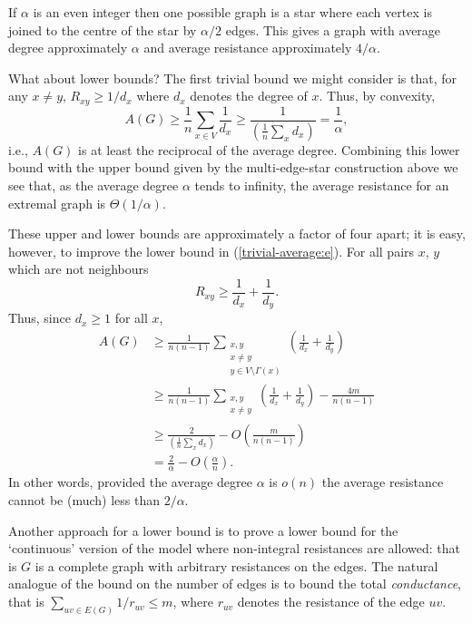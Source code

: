 \documentclass[11pt]{article}
\theoremstyle{remark}
\begin{document}
If $\alpha$ is an even integer then one possible graph is a star where
each vertex is joined to the centre of the star by $\alpha/2$ edges.
This gives a graph with average degree approximately $\alpha$ and
average resistance approximately $4/\alpha$.

What about lower bounds?  The first trivial bound we might consider is
that, for any $x\not=y$, $R_{xy}\ge 1/d_x$ where $d_x$ denotes the
degree of $x$. Thus, by convexity,
\begin{equation}\label{trivial-average:e}
A(G)\ge \frac1{n}\sum_{x\in V} \frac{1}{d_x}\ge \frac{1}{(\frac 1n\sum_xd_x)}=\frac{1}{\alpha},
\end{equation}
i.e., $A(G)$ is at least the reciprocal of the average
degree. Combining this lower bound with the upper bound given by the
multi-edge-star construction above we see that, as the average degree $\alpha$ tends to
infinity, the average resistance for an extremal graph is $\Theta(1/\alpha)$.

These upper and lower bounds are approximately a factor of four apart;
it is easy, however, to improve the lower bound in
(\ref{trivial-average:e}). For all pairs $x$, $y$ which are not
neighbours
\[R_{xy}\ge \frac{1}{d_x}+\frac{1}{d_y}.
\]
Thus, since $d_x\ge 1$ for all $x$,
\begin{align*}
A(G)&\ge \frac1{n(n-1)}\sum_{\substack{x,y\\x\not=y\\y \in V\setminus \Gamma(x)}} \left(\frac{1}{d_x}+\frac{1}{d_y}\right)\\
&\ge \frac1{n(n-1)}\sum_{\substack{x,y\\x\not=y}}\left( \frac{1}{d_x}+\frac{1}{d_y}\right) -\frac{4m}{n(n-1)}\\
&\ge \frac{2}{(\frac 1n\sum_xd_x)}-O\left(\frac{m}{n(n-1)}\right)\\
&= \frac{2}{\alpha}-O\left(\frac{\alpha}{n}\right).
\end{align*}
In other words, provided the average degree $\alpha$ is $o(n)$ the
average resistance cannot be (much) less than $2/\alpha$.

Another approach for a lower bound is to prove a lower bound for the
`continuous' version of the model where non-integral resistances are
allowed: that is $G$ is a complete graph with arbitrary resistances on
the edges. The natural analogue of the bound on the number of edges is
to bound the total \emph{conductance}, that is $\sum_{uv\in E(G)}1/r_{uv}\le m$,
where $r_{uv}$ denotes the resistance of the edge $uv$.
\end{document}
